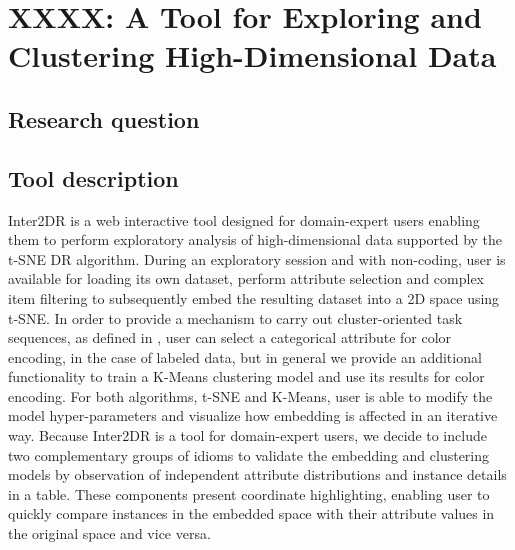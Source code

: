 \chapter{XXXX: A Tool for Exploring and Clustering High-Dimensional Data}
\label{chapter4}

\graphicspath{{Chapter4/figs/}}

\section{Research question} %
\label{section4.1}



\section{Tool description} %
\label{section4.2}

Inter2DR is a web interactive tool designed for domain-expert users enabling them to perform exploratory analysis of high-dimensional data supported by the t-SNE DR algorithm. During an exploratory session and with non-coding, user is available for loading its own dataset, perform attribute selection and complex item filtering to subsequently embed the resulting dataset into a 2D space using t-SNE. In order to provide a mechanism to carry out cluster-oriented task sequences, as defined in \cite{*}, user can select a categorical attribute for color encoding, in the case of labeled data, but in general we provide an additional functionality to train a K-Means clustering model and use its results for color encoding. For both algorithms, t-SNE and K-Means, user is able to modify the model hyper-parameters and visualize how embedding is affected in an iterative way. Because Inter2DR is a tool for domain-expert users, we decide to include two complementary groups of idioms to validate the embedding and clustering models by observation of independent attribute distributions and instance details in a table. These components present coordinate highlighting, enabling user to quickly compare instances in the embedded space with their attribute values in the original space and vice versa. 


